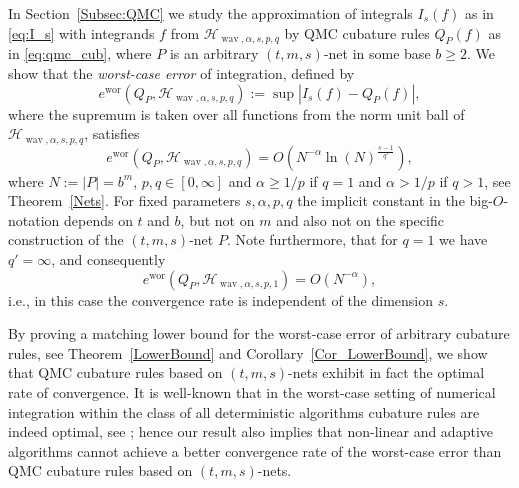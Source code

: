 \documentclass[12pt]{article}
\DeclareMathOperator{\wav}{wav}
\DeclareMathOperator{\wor}{wor}
\begin{document}
In Section~\ref{Subsec:QMC} we study the approximation of integrals $I_s(f)$ as in \eqref{eq:I_s} with integrands $f$ from $\mathcal{H}_{\wav, \alpha, s, p,q}$ by QMC cubature rules $Q_P(f)$ as in \eqref{eq:qmc_cub}, where $P$ is an arbitrary $(t,m,s)$-net in some base $b\ge 2$. We show that the \emph{worst-case error} of integration, defined by
$$e^{\wor}(Q_P, \mathcal{H}_{\wav, \alpha, s, p,q}) := \sup |I_s(f) -Q_P(f)|,$$
where the supremum is taken over all functions from the norm unit ball of $\mathcal{H}_{\wav, \alpha, s, p,q}$, satisfies
\begin{equation}\label{eq:upper_bound_Haar}
e^{\wor}(Q_P, \mathcal{H}_{\wav, \alpha, s, p,q})  = O \left( N^{-\alpha} \ln(N)^{\frac{s-1}{q'}} \right),
\end{equation}   
where $N := |P| = b^m$, $p,q\in [0,\infty]$ and $\alpha \ge 1/p$ if $q=1$ and $\alpha > 1/p$ if $q>1$,
see Theorem~\ref{Nets}. %
For fixed parameters $s, \alpha, p,q$ the implicit constant in the big-$O$-notation depends on $t$ and $b$, but not on $m$ and also not on the specific construction of the $(t,m,s)$-net $P$. Note furthermore, that for $q=1$ we have $q'= \infty$, and consequently
\begin{equation*}
e^{\wor}(Q_P, \mathcal{H}_{\wav, \alpha, s, p,1})  = O \left( N^{-\alpha} \right),
\end{equation*}   
i.e., in this case the convergence rate is independent of the dimension $s$. 

By proving a matching lower bound for the worst-case error of arbitrary cubature rules,
see Theorem~\ref{LowerBound}
and Corollary~\ref{Cor_LowerBound},
we show that QMC cubature rules based on $(t,m,s)$-nets exhibit in fact the optimal rate of convergence. It is well-known that in the worst-case setting of numerical integration within the class of all deterministic algorithms cubature rules are indeed optimal, see \cite{TWW88}; hence our result also implies that non-linear and adaptive algorithms cannot achieve a better convergence rate of the worst-case error  than QMC cubature rules based on $(t,m,s)$-nets.
\end{document}
